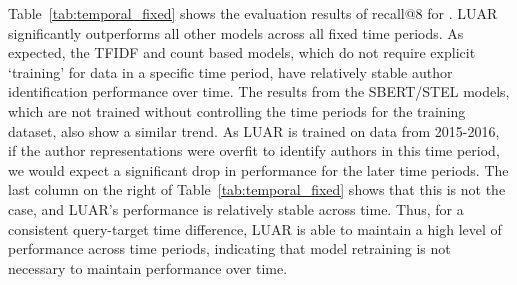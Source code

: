 Table~\ref{tab:temporal_fixed} shows the evaluation results of recall@8 for \DSfixeddelta{}. LUAR significantly outperforms all other models across all fixed time periods.
As expected, the TFIDF and count based models, which do not require explicit `training' for data in a specific time period, have relatively stable author identification performance over time.
The results from the SBERT/STEL models, which are not trained without controlling the time periods for the training dataset, also show a similar trend.
As LUAR is trained on data from 2015-2016, if the author representations were overfit to identify authors in this time period, we would expect a significant drop in performance for the later time periods.
The last column on the right of Table~\ref{tab:temporal_fixed} shows that this is not the case, and LUAR's performance is relatively stable across time.
Thus, for a consistent query-target time difference, LUAR is able to maintain a high level of performance across time periods, indicating that model retraining is not necessary to maintain performance over time.


